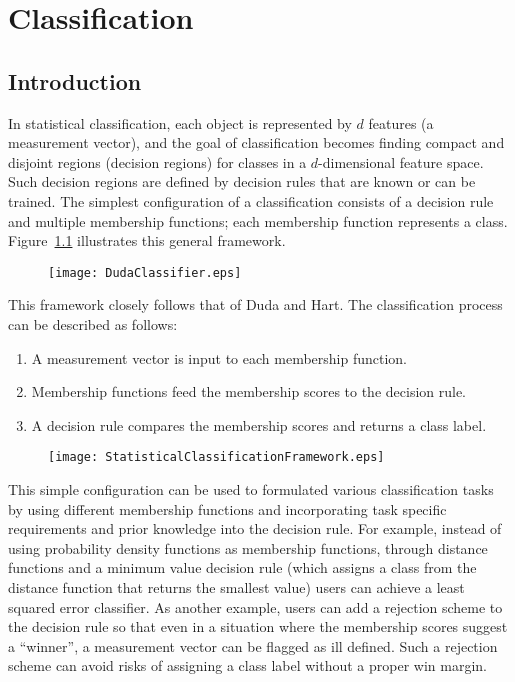 \chapter{Classification}
\section{Introduction}

In statistical classification, each object is represented by $d$ features (a
measurement vector), and the goal of classification becomes finding compact and
disjoint regions (decision regions\cite{Duda2000}) for classes in a
$d$-dimensional feature space. Such decision regions are defined by decision
rules that are known or can be trained.  The simplest configuration of a
classification consists of a decision rule and multiple membership functions;
each membership function represents a class. Figure~\ref{fig:simple}
illustrates this general framework.

\begin{figure}[h]
  \centering
  \texttt{[image: DudaClassifier.eps]}
  \label{fig:simple}
\end{figure}

This framework closely follows that of Duda and
Hart\cite{Duda2000}. The classification process can be described
as follows:

\begin{enumerate}
\item{A measurement vector is input to each membership function.}
\item{Membership functions feed the membership scores to the
    decision rule.}
\item{A decision rule compares the membership scores and returns a
    class label.}
\end{enumerate}

\begin{figure}
  \centering
  \texttt{[image: StatisticalClassificationFramework.eps]}
  \protect\label{fig:StatisticalClassificationFramework}
\end{figure}

This simple configuration can be used to formulated various classification
tasks by using different membership functions and incorporating task specific
requirements and prior knowledge into the decision rule. For example, instead
of using probability density functions as membership functions, through
distance functions and a minimum value decision rule (which assigns a class
from the distance function that returns the smallest value) users can achieve a
least squared error classifier. As another example, users can add a rejection
scheme to the decision rule so that even in a situation where the membership
scores suggest a ``winner'', a measurement vector can be flagged as ill
defined. Such a rejection scheme can avoid risks of assigning a class label
without a proper win margin.

